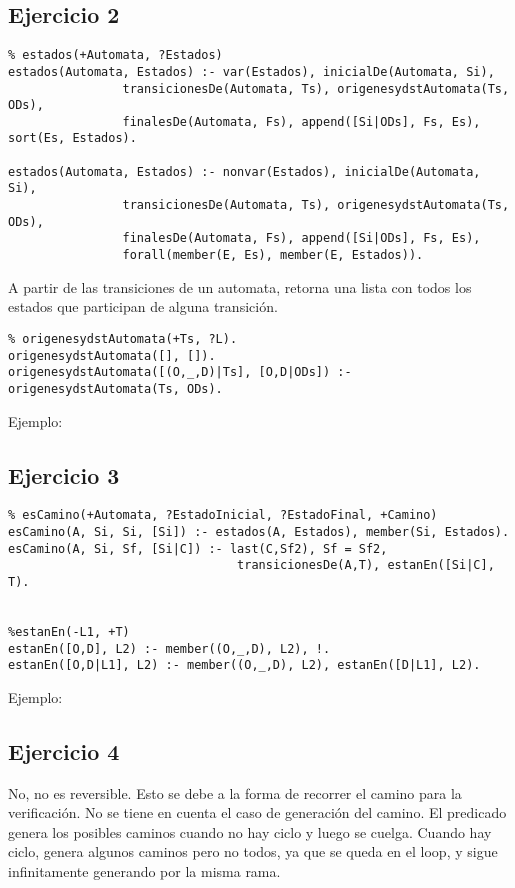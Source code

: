 \documentclass[10pt, a4paper,english,spanish,hidelinks]{article}
\begin{document}
\subsection{Ejercicio 2}

\begin{verbatim}
% estados(+Automata, ?Estados)
estados(Automata, Estados) :- var(Estados), inicialDe(Automata, Si), 
				transicionesDe(Automata, Ts), origenesydstAutomata(Ts, ODs),
				finalesDe(Automata, Fs), append([Si|ODs], Fs, Es), sort(Es, Estados).

estados(Automata, Estados) :- nonvar(Estados), inicialDe(Automata, Si), 
				transicionesDe(Automata, Ts), origenesydstAutomata(Ts, ODs),
				finalesDe(Automata, Fs), append([Si|ODs], Fs, Es),
				forall(member(E, Es), member(E, Estados)).
\end{verbatim}


A partir de las transiciones de un automata, retorna una lista con todos los estados
que participan de alguna transición.

\begin{verbatim}
% origenesydstAutomata(+Ts, ?L).
origenesydstAutomata([], []).
origenesydstAutomata([(O,_,D)|Ts], [O,D|ODs]) :- origenesydstAutomata(Ts, ODs).
\end{verbatim}

Ejemplo:

\subsection{Ejercicio 3}
\begin{verbatim}
% esCamino(+Automata, ?EstadoInicial, ?EstadoFinal, +Camino)
esCamino(A, Si, Si, [Si]) :- estados(A, Estados), member(Si, Estados).
esCamino(A, Si, Sf, [Si|C]) :- last(C,Sf2), Sf = Sf2,
								transicionesDe(A,T), estanEn([Si|C], T).


%estanEn(-L1, +T)
estanEn([O,D], L2) :- member((O,_,D), L2), !.
estanEn([O,D|L1], L2) :- member((O,_,D), L2), estanEn([D|L1], L2). 									
\end{verbatim}

Ejemplo:

\subsection{Ejercicio 4}

No, no es reversible. 
Esto se debe a la forma de recorrer el camino para la verificación. No se tiene
en cuenta el caso de generación del camino.
El predicado genera los posibles caminos cuando no hay ciclo y luego se cuelga.
Cuando hay ciclo, genera algunos caminos pero no todos, ya que se queda en el loop,
y sigue infinitamente generando por la misma rama.
\end{document}
